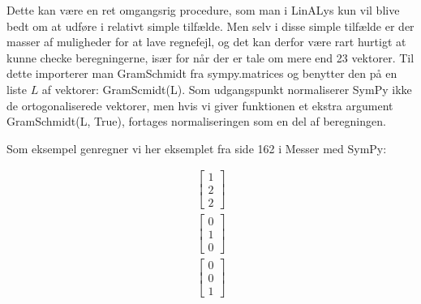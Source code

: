 \documentclass[letterpaper,10pt,english]{jupyterBook}
\begin{document}
Dette kan være en ret omgangsrig procedure, som man i LinALys kun vil blive bedt om at udføre i relativt simple tilfælde. Men selv i disse simple tilfælde er der masser af muligheder for at lave regnefejl, og det kan derfor være rart hurtigt at kunne checke beregningerne, især for når der er tale om mere end 2\sphinxhyphen{}3 vektorer. Til dette importerer man GramSchmidt fra sympy.matrices og benytter den på en liste \(L\) af vektorer: GramScmidt(L). Som udgangspunkt normaliserer SymPy ikke de ortogonaliserede vektorer, men hvis vi giver funktionen et ekstra argument GramSchmidt(L, True), fortages normaliseringen som en del af beregningen.

Som eksempel genregner vi her eksemplet fra side 162 i Messer med SymPy:

\begin{sphinxVerbatim}[commandchars=\\\{\}]
   

  \PYG{p}{[}\PYG{p}{[}  \PYG{p}{]} \PYG{p}{[}  \PYG{p}{]} \PYG{p}{[}  \PYG{p}{]}\PYG{p}{]}
\end{sphinxVerbatim}
\begin{equation*}
\begin{split}\displaystyle \left[\begin{matrix}1\\2\\2\end{matrix}\right]\end{split}
\end{equation*}\begin{equation*}
\begin{split}\displaystyle \left[\begin{matrix}0\\1\\0\end{matrix}\right]\end{split}
\end{equation*}\begin{equation*}
\begin{split}\displaystyle \left[\begin{matrix}0\\0\\1\end{matrix}\right]\end{split}
\end{equation*}
\end{document}
